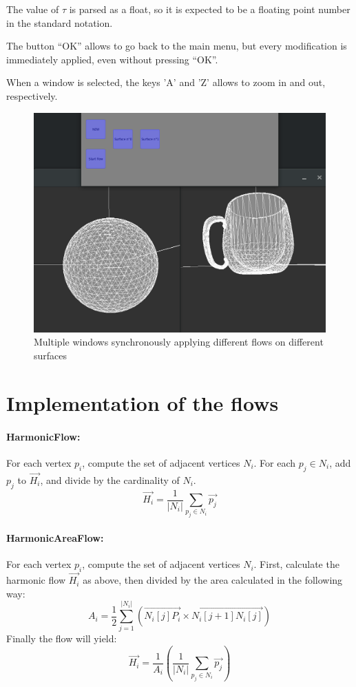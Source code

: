 \documentclass{article}
\begin{document}
The value of $\tau$ is parsed as a float, so it is expected to be a floating point
number in the standard notation.

The button ``OK'' allows to go back to the main menu, but every modification
is immediately applied, even without pressing ``OK''.

When a window is selected, the keys 'A' and 'Z' allows to zoom in and out, respectively.

\begin{figure}[h]
  \begin{center}
    \includegraphics[width=.5\textwidth]{img/mult.png}
    \caption{Multiple windows synchronously applying different flows on different surfaces}
    \label{fig:mult}
  \end{center}
\end{figure}

\section*{Implementation of the flows}

\paragraph*{HarmonicFlow:}
For each vertex $p_i$, compute the set of adjacent vertices $N_i$.
For each $p_j \in N_i$, add $p_j$ to $\overrightarrow{H_i}$, and divide by
the cardinality of $N_i$.
\begin{equation*}
  \overrightarrow{H_i}=\frac{1}{|N_i|} \sum_{p_j \in N_i} \overrightarrow{p_j}
\end{equation*}
\paragraph*{HarmonicAreaFlow:}
For each vertex $p_i$, compute the set of adjacent vertices $N_i$.
First, calculate the harmonic flow $\overrightarrow{H_i}$ as above, then divided by the area
calculated in the following way:
\begin{equation*}
  A_i = \frac{1}{2} \sum_{j = 1}^{|N_i|} (\overrightarrow{N_i[j] P_i} \times \overrightarrow{N_i[j+1] N_i[j]} )
\end{equation*}
Finally the flow will yield:
\begin{equation*}
  \overrightarrow{H_i}=\frac{1}{A_i} \left( \frac{1}{|N_i|} \sum_{p_j \in N_i} \overrightarrow{p_j} \right)
\end{equation*}
\end{document}
